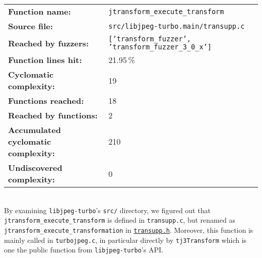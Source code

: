 \documentclass[12pt]{article}
\begin{document}
\medskip
\begin{tabular}{@{}l l@{}}
\textbf{Function name:}            & \texttt{jtransform\_execute\_transform} \\
\textbf{Source file:}              & \texttt{src/libjpeg-turbo.main/transupp.c}                \\
\textbf{Reached by fuzzers:}              & \texttt{['transform\_fuzzer', 'transform\_fuzzer\_3\_0\_x']}                \\
\textbf{Function lines hit:}     & 21.95\,\%                              \\
\textbf{Cyclomatic complexity:}    & 19                                     \\
\textbf{Functions reached:}        & 18                                     \\
\textbf{Reached by functions:}        & 2                                     \\
\textbf{Accumulated cyclomatic complexity:}   & 210\\
\textbf{Undiscovered complexity:}   & 0\\
\end{tabular}
\medskip\\

\noindent By examining \texttt{libjpeg-turbo}'s \texttt{src/} directory, we figured out that \texttt{jtransform\_execute\_transform} is defined in \texttt{transupp.c}, but renamed as \texttt{jtransform\_execute\_transformation} in  \href{https://github.com/libjpeg-turbo/libjpeg-turbo/blob/main/src/transupp.h#L206}{\texttt{transupp.h}}. Moreover, this function is mainly called in \texttt{turbojpeg.c}, in particular directly by \texttt{tj3Transform} which is one the public function from \texttt{libjpeg-turbo}'s API. %

\end{document}
